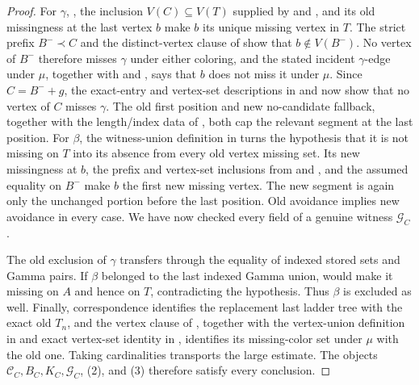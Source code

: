 \begin{proof}
For $\gamma$, , the inclusion
$V(C)\subseteq V(T)$ supplied by  and
, and its old missingness at the last
vertex $b$ make $b$ its unique missing vertex in $T$.  The strict prefix
$B^-\prec C$ and the distinct-vertex clause of 
show that $b\notin V(B^-)$.  No vertex of $B^-$ therefore misses $\gamma$
under either coloring, and the stated
incident $\gamma$-edge under $\mu$, together with
 and , says that $b$ does
not miss it under $\mu$.  Since $C=B^-+g$, the exact-entry and vertex-set
descriptions in  and
 now show that no vertex of $C$ misses
$\gamma$.  The old first position and new no-candidate fallback, together
with the length/index data of , both cap the relevant
segment at the last position.  For $\beta$, the witness-union definition
in  turns the hypothesis that it is not missing
on $T$ into its absence from every old vertex missing set.  Its new
missingness at $b$, the prefix and vertex-set inclusions from
 and
, and the assumed equality on $B^-$ make
$b$ the first new missing vertex.  The new segment is again only the
unchanged portion before the last position.
Old avoidance implies new avoidance in every case.  We have now checked
every field of a genuine  witness $\mathcal G_C$.

The old exclusion of $\gamma$ transfers through the equality of indexed
stored sets and Gamma pairs.  If $\beta$ belonged to the last indexed
Gamma union,  would make it
missing on $A$ and hence on $T$, contradicting the hypothesis.  Thus
$\beta$ is excluded as well.  Finally, correspondence identifies the
replacement last ladder tree with the exact old $T_n$, and the vertex
clause of , together with the vertex-union
definition in  and exact vertex-set identity in
, identifies its missing-color set under
$\mu$ with the old one.  Taking cardinalities transports the large
estimate.  The
objects $\mathcal C_C,B_C,K_C,\mathcal G_C$, (2), and (3) therefore
satisfy every conclusion.
\end{proof}
